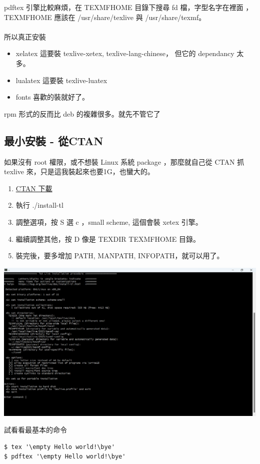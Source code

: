 pdftex 引擎比較麻煩，在 TEXMFHOME 目錄下搜尋 fd 檔，字型名字在裡面
，TEXMFHOME 應該在 /usr/share/texlive 與 /usr/share/texmf。
\\\\
所以真正安裝
\begin{itemize}
\item xelatex 這要裝 texlive-xetex, texlive-lang-chinese，
但它的 dependancy 太多。
\item lualatex 這要裝 texlive-luatex
\item fonts 喜歡的裝就好了。
\end{itemize}
rpm 形式的反而比 deb 的複雜很多。就先不管它了

\subsection{最小安裝 - 從CTAN}
如果沒有 root 權限，或不想裝 Linux 系統 package ，那麼就自己從 CTAN 抓 texlive
來，只是這我裝起來也要1G，也蠻大的。
\begin{enumerate}
\item \href {http://mirror.ctan.org/systems/texlive/tlnet/install-tl-unx.tar.gz}{CTAN 下載}
\item 執行 ./install-tl
\item 調整選項，按 S 選 c ，small scheme, 這個會裝 xetex 引擎。
\item 繼續調整其他，按 D 像是 TEXDIR TEXMFHOME 目錄。
\item 裝完後，要多增加 PATH, MANPATH, INFOPATH，就可以用了。
\end{enumerate}
\begin{center}
\includegraphics[width=\textwidth,height=0.6\textwidth]{images/texlive.png}
\end{center}
試看看最基本的命令
\begin{verbatim}
$ tex '\empty Hello world!\bye'
$ pdftex '\empty Hello world!\bye'
\end{verbatim}
